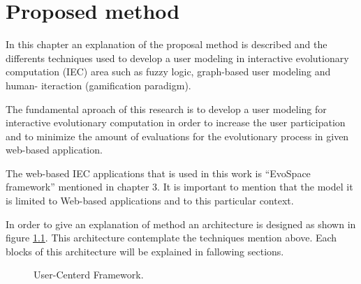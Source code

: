 \chapter{Proposed method}

In this chapter an explanation of the proposal method is described and the
differents techniques used to develop a user modeling in interactive evolutionary
computation (IEC) area such as fuzzy logic, graph-based user modeling and human-
iteraction  (gamification paradigm).

The fundamental aproach of this research is to develop a user modeling for
interactive evolutionary computation in order to increase the user participation
and to minimize the amount of evaluations for the evolutionary process in given
web-based application.

The web-based IEC applications that is used in this work is “EvoSpace framework”
mentioned in chapter 3. It is important to mention that the model it is limited
to Web-based applications and to this particular context.

In order to give an explanation of method an architecture is designed as shown in figure \ref{fig:arch}. This architecture contemplate the techniques mention above. Each blocks of this architecture will be explained in fallowing sections. 

\begin{figure}
	\captionsetup{justification=centering,margin=2cm}
	\centering
	\setlength\fboxsep{0pt}
	\setlength\fboxrule{0.7pt}
	\caption{User-Centerd Framework.}
	\label{fig:arch}       
\end{figure}





